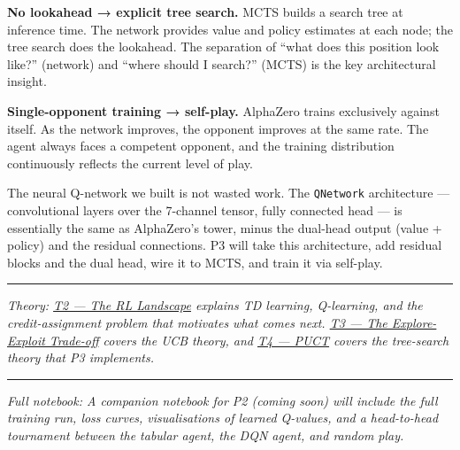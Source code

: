 \textbf{No lookahead → explicit tree search.} MCTS builds a search tree
at inference time. The network provides value and policy estimates at
each node; the tree search does the lookahead. The separation of ``what
does this position look like?'' (network) and ``where should I search?''
(MCTS) is the key architectural insight.

\textbf{Single-opponent training → self-play.} AlphaZero trains
exclusively against itself. As the network improves, the opponent
improves at the same rate. The agent always faces a competent opponent,
and the training distribution continuously reflects the current level of
play.

The neural Q-network we built is not wasted work. The \texttt{QNetwork}
architecture --- convolutional layers over the 7-channel tensor, fully
connected head --- is essentially the same as AlphaZero's tower, minus
the dual-head output (value + policy) and the residual connections. P3
will take this architecture, add residual blocks and the dual head, wire
it to MCTS, and train it via self-play.

\begin{center}\rule{0.5\linewidth}{0.5pt}\end{center}

\emph{Theory: \href{substack/03_reinforcement_learning_landscape.md}{T2 --- The RL Landscape}
explains TD learning, Q-learning, and the credit-assignment problem that
motivates what comes next. \href{substack/04_explore_exploit_tradeoff.md}{T3
--- The Explore-Exploit Trade-off} covers the UCB theory, and
\href{substack/05_puct.md}{T4 --- PUCT} covers the tree-search theory
that P3 implements.}

\begin{center}\rule{0.5\linewidth}{0.5pt}\end{center}

\emph{Full notebook: A companion notebook for P2 (coming soon) will
include the full training run, loss curves, visualisations of learned
Q-values, and a head-to-head tournament between the tabular agent, the
DQN agent, and random play.}
